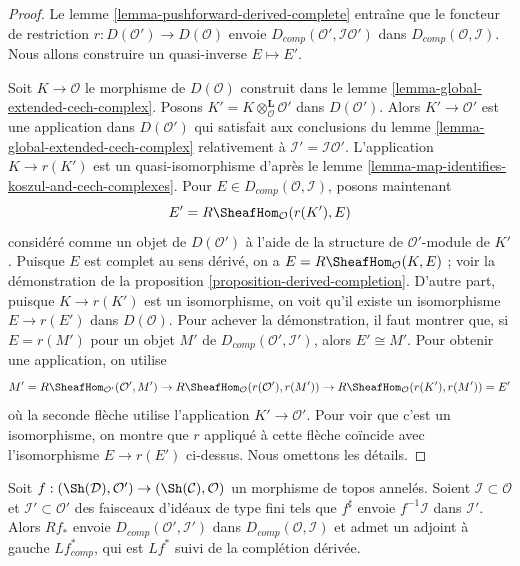 \begin{proof}
Le lemme \ref{lemma-pushforward-derived-complete} entraîne que le foncteur de
restriction $r : D(\mathcal{O}') \to D(\mathcal{O})$
envoie $D_{comp}(\mathcal{O}', \mathcal{I}\mathcal{O}')$
dans $D_{comp}(\mathcal{O}, \mathcal{I})$. Nous allons construire un
quasi-inverse $E \mapsto E'$.

\medskip\noindent
Soit $K \to \mathcal{O}$ le morphisme de $D(\mathcal{O})$
construit dans le lemme \ref{lemma-global-extended-cech-complex}.
Posons $K' = K \otimes_\mathcal{O}^\mathbf{L} \mathcal{O}'$ dans $D(\mathcal{O}')$.
Alors $K' \to \mathcal{O}'$ est une application dans $D(\mathcal{O}')$ qui
satisfait aux conclusions du lemme \ref{lemma-global-extended-cech-complex}
relativement à $\mathcal{I}' = \mathcal{I}\mathcal{O}'$.
L'application $K \to r(K')$ est un quasi-isomorphisme d'après le
lemme \ref{lemma-map-identifies-koszul-and-cech-complexes}.
Pour $E \in D_{comp}(\mathcal{O}, \mathcal{I})$, posons maintenant
$$
E' = R\SheafHom_\mathcal{O}(r(K'), E)
$$
considéré comme un objet de $D(\mathcal{O}')$ à l'aide de la structure de $\mathcal{O}'$-module
de $K'$. Puisque $E$ est complet au sens dérivé,
on a $E = R\SheafHom_\mathcal{O}(K, E)$ ; voir la
démonstration de la proposition \ref{proposition-derived-completion}.
D'autre part, puisque $K \to r(K')$ est un isomorphisme,
on voit qu'il existe un isomorphisme
$E \to r(E')$ dans $D(\mathcal{O})$. Pour achever la démonstration, il
faut montrer que, si $E = r(M')$ pour un objet $M'$ de
$D_{comp}(\mathcal{O}', \mathcal{I}')$, alors
$E' \cong M'$. Pour obtenir une application, on utilise
$$
M' = R\SheafHom_{\mathcal{O}'}(\mathcal{O}', M') \to
R\SheafHom_\mathcal{O}(r(\mathcal{O}'), r(M')) \to
R\SheafHom_\mathcal{O}(r(K'), r(M')) = E'
$$
où la seconde flèche utilise l'application $K' \to \mathcal{O}'$.
Pour voir que c'est un isomorphisme, on montre que $r$ appliqué
à cette flèche coïncide avec l'isomorphisme $E \to r(E')$ ci-dessus.
Nous omettons les détails.
\end{proof}

\begin{lemma}
\label{lemma-pushforward-derived-complete-adjoint}
Soit $f : (\Sh(\mathcal{D}), \mathcal{O}') \to (\Sh(\mathcal{C}), \mathcal{O})$
un morphisme de topos annelés. Soient $\mathcal{I} \subset \mathcal{O}$
et $\mathcal{I}' \subset \mathcal{O}'$
des faisceaux d'idéaux de type fini tels que $f^\sharp$ envoie
$f^{-1}\mathcal{I}$ dans $\mathcal{I}'$.
Alors $Rf_*$ envoie $D_{comp}(\mathcal{O}', \mathcal{I}')$
dans $D_{comp}(\mathcal{O}, \mathcal{I})$ et admet un adjoint à gauche
$Lf_{comp}^*$, qui est $Lf^*$ suivi de la complétion dérivée.
\end{lemma}

